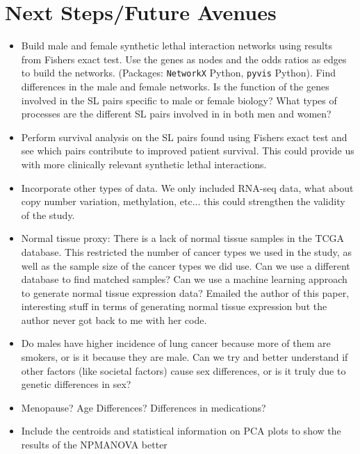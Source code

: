 \documentclass[10pt]{article}
\begin{document}
\clearpage\newpage
\section{Next Steps/Future Avenues}
\begin{itemize}
	\item Build male and female synthetic lethal interaction networks using results from Fishers exact test. Use the genes as nodes and the odds ratios as edges to build the networks. (Packages: \texttt{NetworkX} Python, \texttt{pyvis} Python). Find differences in the male and female networks. Is the function of the genes involved in the SL pairs specific to male or female biology? What types of processes are the different SL pairs involved in in both men and women?
	\item Perform survival analysis on the SL pairs found using Fishers exact test and see which pairs contribute to improved patient survival. This could provide us with more clinically relevant synthetic lethal interactions.
	\item Incorporate other types of data. We only included RNA-seq data, what about copy number variation, methylation, etc... this could strengthen the validity of the study.
	\item Normal tissue proxy: There is a lack of normal tissue samples in the TCGA database. This restricted the number of cancer types we used in the study, as well as the sample size of the cancer types we did use. Can we use a different database to find matched samples? Can we use a machine learning approach to generate normal tissue expression data? Emailed the author of this paper, interesting stuff in terms of generating normal tissue expression but the author never got back to me with her code. \citep{zeng2019selecting}
	\item Do males have higher incidence of lung cancer because more of them are smokers, or is it because they are male. Can we try and better understand if other factors (like societal factors) cause sex differences, or is it truly due to genetic differences in sex?
	\item Menopause? Age Differences? Differences in medications?
	\item Include the centroids and statistical information on PCA plots to show the results of the NPMANOVA better
\end{itemize}

\end{document}

